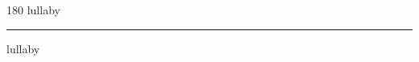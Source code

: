
\begin{frame}
\begin{center}
\begin{turn}{180}
{\fontsize{2.5cm}{1em}\selectfont lullaby}
\end{turn}
\vspace{1em}\par  
\hrule
\vspace{1em}\par  
{\fontsize{2.5cm}{1em}\selectfont lullaby}
\end{center}
\end{frame}

